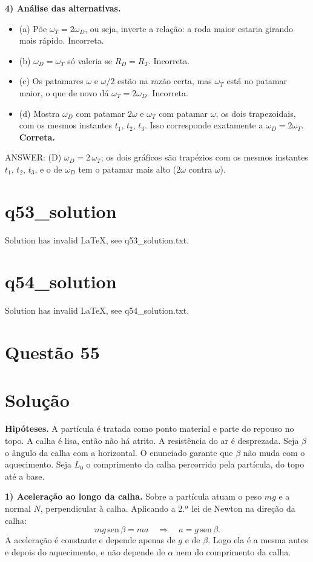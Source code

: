 \documentclass{article}%
\begin{document}
\textbf{4) Análise das alternativas.}
\begin{itemize}
\item (a) Põe $\omega_T = 2\omega_D$, ou seja, inverte a relação: a roda maior estaria girando mais rápido. Incorreta.
\item (b) $\omega_D = \omega_T$ só valeria se $R_D = R_T$. Incorreta.
\item (c) Os patamares $\omega$ e $\omega/2$ estão na razão certa, mas $\omega_T$ está no patamar maior, o que de novo dá $\omega_T = 2\omega_D$. Incorreta.
\item (d) Mostra $\omega_D$ com patamar $2\omega$ e $\omega_T$ com patamar $\omega$, os dois trapezoidais, com os mesmos instantes $t_1$, $t_2$, $t_3$. Isso corresponde exatamente a $\omega_D = 2\omega_T$. \textbf{Correta.}
\end{itemize}

ANSWER: (D) $\omega_D = 2\,\omega_T$; os dois gráficos são trapézios com os mesmos instantes $t_1$, $t_2$, $t_3$, e o de $\omega_D$ tem o patamar mais alto ($2\omega$ contra $\omega$).%
\newpage%
\section*{q53_solution}%
Solution has invalid LaTeX, see q53\_solution.txt.%
\newpage%
\section*{q54_solution}%
Solution has invalid LaTeX, see q54\_solution.txt.%
\newpage%
\section*{Questão 55}

\section*{Solução}

\textbf{Hipóteses.} A partícula é tratada como ponto material e parte do repouso no topo. A calha é lisa, então não há atrito. A resistência do ar é desprezada. Seja $\beta$ o ângulo da calha com a horizontal. O enunciado garante que $\beta$ não muda com o aquecimento. Seja $L_0$ o comprimento da calha percorrido pela partícula, do topo até a base.

\textbf{1) Aceleração ao longo da calha.} Sobre a partícula atuam o peso $mg$ e a normal $N$, perpendicular à calha. Aplicando a 2.ª lei de Newton na direção da calha:
\[
mg\,\text{sen}\,\beta = m a \quad\Longrightarrow\quad a = g\,\text{sen}\,\beta .
\]
A aceleração é constante e depende apenas de $g$ e de $\beta$. Logo ela é a mesma antes e depois do aquecimento, e não depende de $\alpha$ nem do comprimento da calha.
\end{document}
